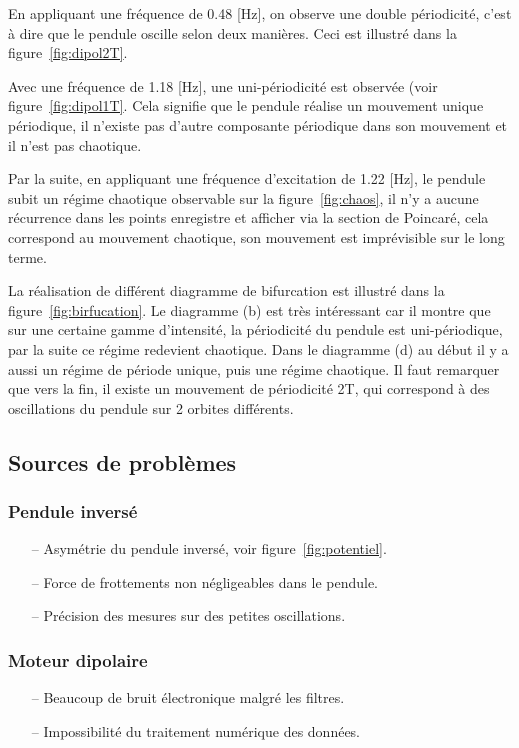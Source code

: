 \documentclass[a4paper,12pt,oneside]{article}
\begin{document}
En appliquant une fréquence de 0.48 [Hz], on observe une double périodicité, c'est à dire que le pendule oscille selon deux manières.%
Ceci est illustré dans la figure~\ref{fig:dipol2T}.

Avec une fréquence de 1.18 [Hz], une uni-périodicité est observée (voir figure~\ref{fig:dipol1T}. Cela signifie que le pendule réalise un mouvement unique périodique, il n'existe pas d'autre composante périodique dans son mouvement et il n'est pas chaotique.

Par la suite, en appliquant une fréquence d'excitation de 1.22 [Hz], le pendule subit un régime chaotique observable sur la figure~\ref{fig:chaos}, il n'y a aucune récurrence dans les points enregistre et afficher via la section de Poincaré, cela correspond au mouvement chaotique, son mouvement est imprévisible sur le long terme.


La réalisation de différent diagramme de bifurcation est illustré dans la figure~\ref{fig:birfucation}. Le diagramme (b) est très intéressant car il montre que sur une certaine gamme d'intensité, la périodicité du pendule est uni-périodique, par la suite ce régime redevient chaotique.
Dans le diagramme (d) au début il y a aussi un régime de période unique, puis une régime chaotique. Il faut remarquer que vers la fin, il existe un mouvement de périodicité 2T, qui correspond à des oscillations du pendule sur 2 orbites différents.

\subsection{Sources de problèmes}

\subsubsection{Pendule inversé}
\begin{itemize}
	\item[--] Asymétrie du pendule inversé, voir figure~\ref{fig:potentiel}.
	\item[--] Force de frottements non négligeables dans le pendule.
	\item[--] Précision des mesures sur des petites oscillations.
\end{itemize}

\subsubsection{Moteur dipolaire}
\begin{itemize}
	\item[--] Beaucoup de bruit électronique malgré les filtres.
	\item[--] Impossibilité du traitement numérique des données.
\end{itemize}
\end{document}
